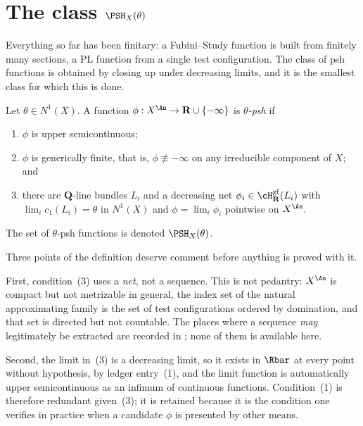 \section{The class \texorpdfstring{\(\PSH_X(\theta)\)}{PSH(theta)}}
\label{sec:ch34-psh}

Everything so far has been finitary: a Fubini--Study function is built from
finitely many sections, a PL function from a single test configuration.  The
class of psh functions is obtained by closing up under decreasing limits,
and it is the smallest class for which this is done.

\begin{definition}
\label{def:bj-psh}
Let \(\theta\in N^1(X)\).  A function
\(\phi:X^{\An}\to\mathbf R\cup\{-\infty\}\) is \emph{\(\theta\)-psh} if
\begin{enumerate}
\item \(\phi\) is upper semicontinuous;
\item \(\phi\) is generically finite, that is, \(\phi\not\equiv-\infty\) on
      any irreducible component of \(X\); and
\item there are \(\mathbf Q\)-line bundles \(L_i\) and a decreasing net
      \(\phi_i\in\cH^{\mathrm{gf}}_{\mathbf R}(L_i)\) with
      \(\lim_i c_1(L_i)=\theta\) in \(N^1(X)\) and \(\phi=\lim_i\phi_i\)
      pointwise on \(X^{\An}\).
\end{enumerate}
The set of \(\theta\)-psh functions is denoted \(\PSH_X(\theta)\).
\end{definition}

Three points of the definition deserve comment before anything is proved
with it.

First, condition~(3) uses a \emph{net}, not a sequence.  This is not
pedantry: \(X^{\An}\) is compact but not metrizable in general, the index
set of the natural approximating family is the set of test configurations
ordered by domination, and that set is directed but not countable.  The
places where a sequence \emph{may} legitimately be extracted are recorded in
; none of them is available here.

Second, the limit in~(3) is a decreasing limit, so it exists in
\(\Rbar\) at every point without hypothesis, by ledger entry~(1), and the
limit function is automatically upper semicontinuous as an infimum of
continuous functions.  Condition~(1) is therefore redundant given~(3); it is
retained because it is the condition one verifies in practice when a
candidate \(\phi\) is presented by other means.

